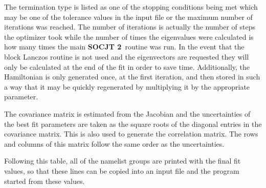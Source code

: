 \documentclass{article}
\newcommand{\socjttwo}{{\bf SOCJT 2}}
\newcommand{\socjt}{{\bf SOCJT}}
\newcommand{\etoe}{{\bf e2e}}
\begin{document}
The termination type is listed as one of the stopping conditions being met which may be one of the tolerance values in the input file or the maximum number of iterations was reached. The number of iterations is actually the number of steps the optimizer took while the number of times the eigenvalues were calculated is how many times the main \socjttwo\ routine was run. In the event that the block Lanczos routine is not used and the eigenvectors are requested they will only be calculated at the end of the fit in order to save time. Additionally, the Hamiltonian is only generated once, at the first iteration, and then stored in such a way that it may be quickly regenerated by multiplying it by the appropriate parameter.

The covariance matrix is estimated from the Jacobian and the uncertainties of the best fit parameters are taken as the square roots of the diagonal entries in the covariance matrix. This is also used to generate the correlation matrix. The rows and columns of this matrix follow the same order as the uncertainties.

Following this table, all of the namelist groups are printed with the
final fit values, so that these lines can be copied into an input file
and the program started from these values.


\end{document}
